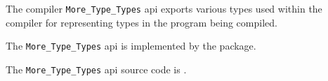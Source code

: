
The compiler {\tt More\_Type\_Types} api exports various types used within 
the compiler for representing types in the program being compiled.

The {\tt More\_Type\_Types} api is implemented by the  package.

The {\tt More\_Type\_Types} api source code is .





